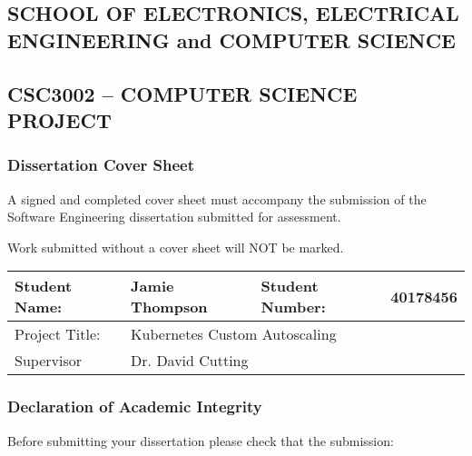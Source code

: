 \makeatletter
\newcommand{\listintertext}{\@ifstar\listintertext@\listintertext@@}
\newcommand{\listintertext@}[1]{%
  \hspace*{-\@totalleftmargin}#1}
\newcommand{\listintertext@@}[1]{%
  \hspace{-\leftmargin}#1}
\makeatother

\begin{center}
\section*{\centering SCHOOL OF ELECTRONICS, ELECTRICAL ENGINEERING and COMPUTER SCIENCE}

\subsection*{\centering CSC3002 – COMPUTER SCIENCE PROJECT}

\subsubsection*{\centering Dissertation Cover Sheet}

A signed and completed cover sheet must accompany the submission of the Software
Engineering dissertation submitted for assessment.


Work submitted without a cover sheet will NOT be marked.  

\begin{table}[h]
\centering
\begin{tabular}{|l|l|l|l|}
\hline
Student Name:  & Jamie Thompson    & Student Number:   & 40178456   \\ \hline
Project Title: & \multicolumn{3}{l|}{Kubernetes Custom Autoscaling} \\ \hline
Supervisor     & \multicolumn{3}{l|}{Dr. David Cutting}             \\ \hline
\end{tabular}
\end{table}

\subsubsection*{\centering Declaration of Academic Integrity}

\end{center}

Before submitting your dissertation please check that the submission:

